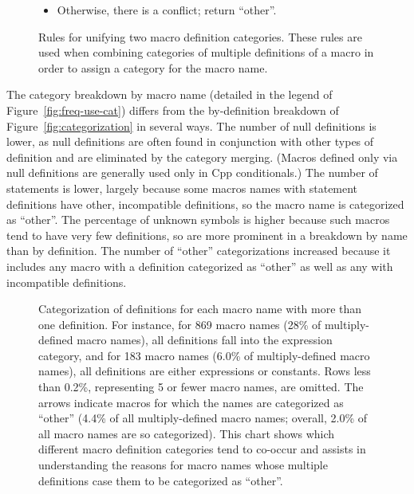 \documentclass[10pt]{article}
\newcommand{\captionsmall}[1]{\caption[]{\small #1}}
\begin{document}
\begin{figure}
\begin{itemize}
\item Otherwise, there is a conflict; return ``other''.
\end{itemize}


\captionsmall{Rules for unifying two macro definition categories.  These
  rules are used when combining categories of multiple definitions of a
  macro in order to assign a category for the macro name.}
\label{fig:category-lub}
\end{figure}



The category breakdown by macro name (detailed in the legend of
Figure~\ref{fig:freq-use-cat}) differs from the by-definition breakdown of
Figure~\ref{fig:categorization} in several ways.  The number of null
definitions is lower, as null definitions are often found in conjunction
with other types of definition and are eliminated by the category merging.
(Macros defined only via null definitions are generally used only in Cpp
conditionals.)  The number of statements is lower, largely because
some macros names with statement definitions have other, incompatible
definitions, so the macro name is categorized as ``other''.  The percentage
of unknown symbols is higher because such macros tend to have very few
definitions, so are more prominent in a breakdown by name than by
definition.  The number of ``other'' categorizations increased because it
includes any macro with a definition categorized as ``other'' as well as any
with incompatible definitions.


\begin{figure}
  {\small\centerline{}}
  
  \captionsmall{Categorization of definitions for each macro name with more
    than one definition.
    For instance, for 869 macro names (28\% of multiply-defined macro
    names), all definitions fall into the expression category, and for 183
    macro names (6.0\% of multiply-defined macro names), all definitions
    are either expressions or constants.
    Rows less than 0.2\%, representing 5 or fewer macro names, are omitted.
    The arrows indicate macros for which the
    names are categorized as ``other'' (4.4\% of all multiply-defined
    macro names; overall, 2.0\% of all macro names are so categorized).
    This chart shows which different macro definition categories tend
    to co-occur and assists in understanding the reasons for macro names
    whose multiple definitions case them to be categorized as ``other''.}

  \label{fig:subset-categories}
\end{figure}
\end{document}
